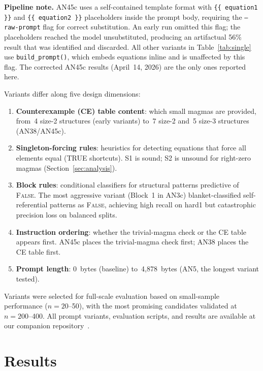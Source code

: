 \documentclass[11pt]{article}
\begin{document}
\smallskip
\noindent\textbf{Pipeline note.} AN45c uses a self-contained template
format with \texttt{\{\{ equation1 \}\}} and \texttt{\{\{ equation2 \}\}}
placeholders inside the prompt body, requiring the \texttt{--raw-prompt}
flag for correct substitution. An early run omitted this flag; the
placeholders reached the model unsubstituted, producing an artifactual
56\% result that was identified and discarded. All other variants in
Table~\ref{tab:single} use \texttt{build\_prompt()}, which embeds
equations inline and is unaffected by this flag. The corrected AN45c
results (April~14, 2026) are the only ones reported here.
\smallskip

Variants differ along five design dimensions:

\begin{enumerate}
  \item \textbf{Counterexample (CE) table content}: which small magmas
    are provided, from~4 size-2 structures (early variants) to~7
    size-2 and~5 size-3 structures (AN38/AN45c).
  \item \textbf{Singleton-forcing rules}: heuristics for detecting
    equations that force all elements equal (TRUE shortcuts). S1 is
    sound; S2 is unsound for right-zero magmas (Section~\ref{sec:analysis}).
  \item \textbf{Block rules}: conditional classifiers for structural
    patterns predictive of \textsc{False}. The most aggressive variant
    (Block~1 in AN3c) blanket-classified self-referential patterns as
    \textsc{False}, achieving high recall on hard1 but catastrophic
    precision loss on balanced splits.
  \item \textbf{Instruction ordering}: whether the trivial-magma check
    or the CE table appears first. AN45c places the trivial-magma
    check first; AN38 places the CE table first.
  \item \textbf{Prompt length}: 0~bytes (baseline) to~4{,}878~bytes
    (AN5, the longest variant tested).
\end{enumerate}

Variants were selected for full-scale evaluation based on
small-sample performance ($n=20$--50), with the most promising
candidates validated at $n=200$--400. All prompt variants, evaluation
scripts, and results are available at our companion
repository~\citep{cazares2026sair}.

\section{Results}
\label{sec:results}
\end{document}
